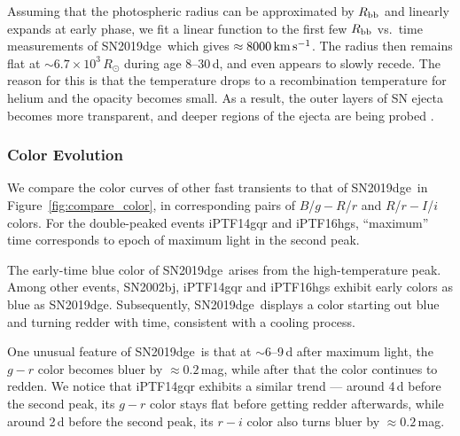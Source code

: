 \documentclass[twocolumn]{aastex63}
\newcommand{\name}{SN2019dge}
\begin{document}
\begin{CJK*}{UTF8}{gbsn}
Assuming that the photospheric radius can be approximated by $R_{\rm bb}$ and linearly expands at 
early phase, we fit a linear function to the first few $R_{\rm bb}$ vs.~time measurements of \name\, 
which gives $\approx 8000\, {\rm km\,s^{-1}}$. The radius then remains flat at $\sim 6.7\times 
10^3\,R_\odot$ during age 8--30\,d, and even appears to slowly recede. The reason for this is that the 
temperature drops to a recombination temperature for helium and the opacity becomes small. As a 
result, the outer layers of SN ejecta becomes more transparent, and deeper regions of the ejecta are 
being probed \citep{Piro2014}.

\subsubsection{Color Evolution}
We compare the color curves of other fast transients to that of \name\ in 
Figure~\ref{fig:compare_color}, in corresponding pairs of $B$/$g-R$/$r$ and $R$/$r-I$/$i$ colors. For 
the double-peaked events iPTF14gqr and iPTF16hgs, ``maximum'' time corresponds to epoch of 
maximum light in the second peak.

The early-time blue color of \name\ arises from the high-temperature peak. Among other events, 
SN2002bj, iPTF14gqr and iPTF16hgs exhibit early colors as blue as \name. Subsequently, 
\name\ displays a color starting out blue and turning redder with time, consistent with a cooling 
process. 

One unusual feature of \name\ is that at $\sim6$--9\,d after maximum light, the $g-r$ color becomes 
bluer by $\approx 0.2$\,mag, while after that the color continues to redden. We notice that iPTF14gqr
exhibits a similar trend --- around 4\,d before the second peak, its $g-r$ color stays flat before getting 
redder afterwards, while around 2\,d before the second peak, its $r-i$ color also turns bluer by 
$\approx 0.2$\,mag.


\end{CJK*}
\end{document}
